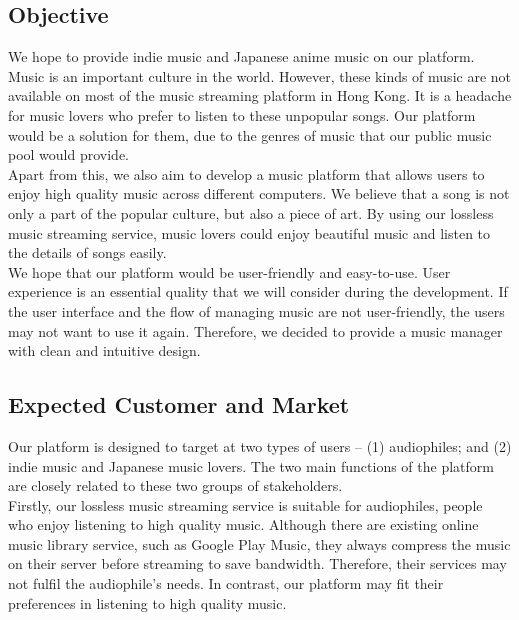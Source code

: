 \documentclass[12pt, a4paper, oneside]{article}
\begin{document}
\newpage
\subsection{Objective}

We hope to provide indie music and Japanese anime music on our platform.
Music is an important culture in the world. However, these kinds of music are not available
on most of the music streaming platform in Hong Kong. It is a headache for music lovers
who prefer to listen to these unpopular songs. Our platform would be a solution for them,
due to the genres of music that our public music pool would provide.\\

Apart from this, we also aim to develop a music platform that allows users to enjoy high quality
music across different computers. We believe that a song is not only a part of the
popular culture, but also a piece of art. By using our lossless music streaming service,
music lovers could enjoy beautiful music and listen to the details of songs easily.\\

We hope that our platform would be user-friendly and easy-to-use. User experience is an essential
quality that we will consider during the development. If the user interface and the flow of
managing music are not user-friendly, the users may not want to use it again. Therefore,
we decided to provide a music manager with clean and intuitive design.\\

\subsection{Expected Customer and Market}

Our platform is designed to target at two types of users -- (1) audiophiles;
and (2) indie music and Japanese music lovers. The two main functions of the platform are
closely related to these two groups of stakeholders.\\

Firstly, our lossless music streaming service is suitable for audiophiles,
people who enjoy listening to high quality music. Although there are existing online music
library service, such as Google Play Music, they always compress the music on their server
before streaming to save bandwidth. Therefore, their services may not fulfil the audiophile's
needs. In contrast, our platform may fit their preferences in listening to high quality music.\\
\end{document}
